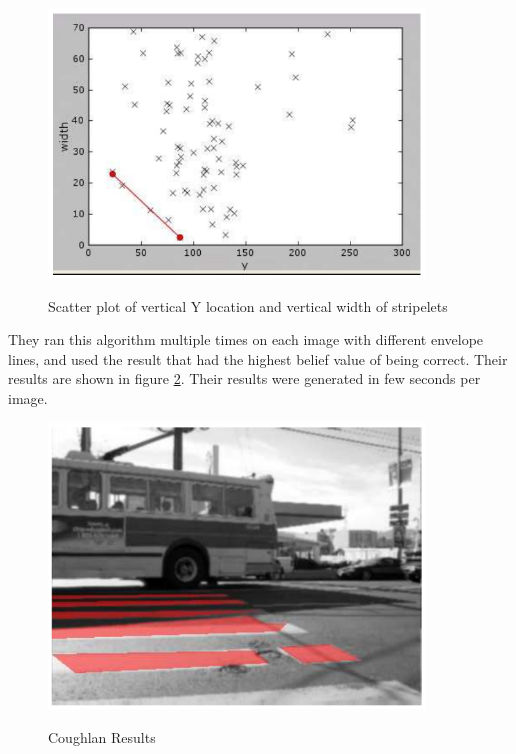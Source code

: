 \documentclass[12pt]{ucthesis}
\newcommand{\captionfonts}{\small\bf\ssp}
\begin{document}
\begin{figure}[h!]
\begin{center}
\includegraphics[width=10cm]{CoughlanScatter.png}
\captionfonts
\caption[Coughlan Scatterplot of Y and Vertical Width]{Scatter plot of vertical Y location and vertical width of stripelets \cite{Coughlan2006}}
\label{fig:CoughlanScatter}
\end{center}
\end{figure}

They ran this algorithm multiple times on each image with different envelope lines, and used the result that had the highest belief value of being correct. Their results are shown in figure \ref{fig:CoughlanResults}. Their results were generated in few seconds per image. 

\begin{figure}[h!]
\begin{center}
\includegraphics[width=10cm]{CoughlanResult.png}
\captionfonts
\caption[Coughlan Results]{Coughlan Results \cite{Coughlan2006}}
\label{fig:CoughlanResults}
\end{center}
\end{figure}
\end{document}
